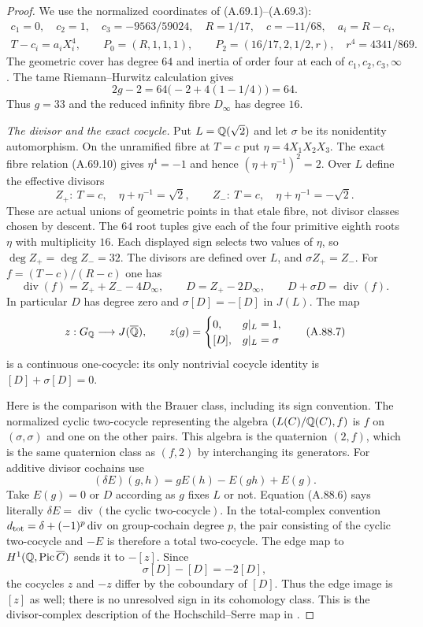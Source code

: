 \begin{proof}
We use the normalized coordinates of (A.69.1)--(A.69.3):
\[
 \begin{gathered}
 c_1=0,\quad c_2=1,\quad c_3=-9563/59024,\quad
 R=1/17,\quad c=-11/68,\quad a_i=R-c_i,\\
 T-c_i=a_iX_i^4,\qquad
 P_0=(R,1,1,1),\qquad
 P_2=(16/17,2,1/2,r),\quad r^4=4341/869.
 \end{gathered}
 \tag{A.88.3}
\]
The geometric cover has degree $64$ and inertia of order
four at each of $c_1,c_2,c_3,\infty$.
The tame Riemann--Hurwitz calculation gives
\[
                  2g-2=64\bigl(-2+4(1-1/4)\bigr)=64.
 \tag{A.88.4}
\]
Thus $g=33$ and the reduced infinity fibre $D_\infty$
has degree $16$.

\emph{The divisor and the exact cocycle.}
Put $L=\mathbb Q(\sqrt2)$ and let $\sigma$ be its nonidentity automorphism.
On the unramified fibre at $T=c$ put
$\eta=4X_1X_2X_3$.
The exact fibre relation (A.69.10) gives
$\eta^4=-1$ and hence
$(\eta+\eta^{-1})^2=2$.
Over $L$ define the effective divisors
\[
 Z_+:\ T=c,\quad\eta+\eta^{-1}=\sqrt2,\qquad
 Z_-:\ T=c,\quad\eta+\eta^{-1}=-\sqrt2.
 \tag{A.88.5}
\]
These are actual unions of geometric points in that etale
fibre, not divisor classes chosen by descent.
The $64$ root tuples give each of the four primitive
eighth roots $\eta$ with multiplicity $16$.
Each displayed sign selects two values of $\eta$,
so $\deg Z_+=\deg Z_-=32$.
The divisors are defined over $L$, and $\sigma Z_+=Z_-$.
For
$f=(T-c)/(R-c)$ one has
\[
 \operatorname{div}(f)=Z_++Z_- -4D_\infty,\qquad
 D=Z_+-2D_\infty,\qquad
                         D+\sigma D=\operatorname{div}(f).
 \tag{A.88.6}
\]
In particular $D$ has degree zero and
$\sigma[D]=-[D]$ in $J(L)$.
The map
\[
 z:G_\mathbb Q\longrightarrow J(\overline{\mathbb Q}),\qquad
 z(g)=
 \begin{cases}
 0,&g|_L=1,\\
 [D],&g|_L=\sigma
 \end{cases}
 \tag{A.88.7}
\]
is a continuous one-cocycle: its only nontrivial cocycle
identity is $[D]+\sigma[D]=0$.

Here is the comparison with the Brauer class, including
its sign convention.
The normalized cyclic two-cocycle representing the algebra
$(L(C)/\mathbb Q(C),f)$ is $f$ on $(\sigma,\sigma)$ and one
on the other pairs.
This algebra is the quaternion $(2,f)$, which is the same
quaternion class as $(f,2)$ by interchanging its generators.
For additive divisor cochains use
\[
              (\delta E)(g,h)=gE(h)-E(gh)+E(g).
 \tag{A.88.8}
\]
Take $E(g)=0$ or $D$ according as $g$ fixes $L$ or not.
Equation (A.88.6) says literally
$\delta E=\operatorname{div}(\text{the cyclic two-cocycle})$.
In the total-complex convention
$d_{\rm tot}=\delta+(-1)^p\operatorname{div}$
on group-cochain degree $p$, the pair consisting of
the cyclic two-cocycle and $-E$ is therefore a total
two-cocycle.  The edge map to
$H^1(\mathbb Q,\operatorname{Pic}\overline C)$ sends it to $-[z]$.
Since
\[
        \sigma[D]-[D]=-2[D],
 \tag{A.88.9}
\]
the cocycles $z$ and $-z$ differ by the coboundary of $[D]$.
Thus the edge image is $[z]$ as well; there is no
unresolved sign in its cohomology class.
This is the divisor-complex description of the
Hochschild--Serre map in
\cite[Proposition 4.3.4 and Remark 4.3.5]{AgentCTSkoro2019}.


\end{proof}
